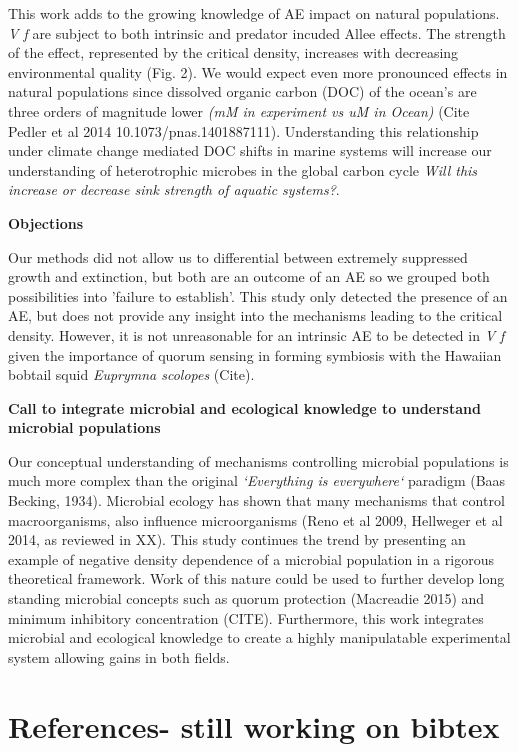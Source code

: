 \documentclass[a4paper,10pt]{article}
\begin{document}
This work adds to the growing knowledge of AE impact on natural populations. \textit{V f} are subject to both intrinsic and predator incuded Allee effects. The strength of the effect, represented by the critical density, increases with decreasing environmental quality (Fig. 2). We would expect even more pronounced effects in natural populations since dissolved organic carbon (DOC) of the ocean's are three orders of magnitude lower \textit{(mM in experiment vs uM in Ocean)} (Cite Pedler et al 2014  10.1073/pnas.1401887111).  Understanding this relationship under climate change mediated DOC shifts in marine systems will increase our understanding of heterotrophic microbes in the global carbon cycle \textit{Will this increase or decrease sink strength of aquatic systems?}. 
	
\textbf{Objections}

Our methods did not allow us to differential between extremely suppressed growth and extinction, but both are an outcome of an AE so we grouped both possibilities into 'failure to establish'. 
This study only detected the presence of an AE, but does not provide any insight into the mechanisms leading to the critical density. However, it is not unreasonable for an intrinsic AE to be detected in \textit{V f} given the importance of quorum sensing in forming symbiosis with the Hawaiian bobtail squid \textit{Euprymna scolopes} (Cite).
  
\textbf{Call to integrate microbial and ecological knowledge to understand microbial populations}

Our conceptual understanding of mechanisms controlling microbial populations is much more complex than the original \textit{`Everything is everywhere`} paradigm (Baas Becking, 1934). Microbial ecology has shown that many mechanisms that control macroorganisms, also influence microorganisms (Reno et al 2009, Hellweger et al 2014, as reviewed in XX). This study continues the trend by presenting an example of negative density dependence of a microbial population in a rigorous theoretical framework. Work of this nature could be used to further develop long standing microbial concepts such as quorum protection (Macreadie 2015) and minimum inhibitory concentration (CITE). Furthermore, this work integrates microbial and ecological knowledge to create a highly manipulatable experimental system allowing gains in both fields.  


\section{References- still working on bibtex}
\end{document}
